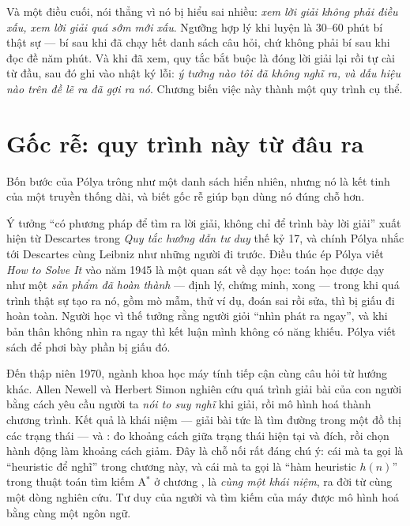 \documentclass[../../algorithm.tex]{subfiles}
\begin{document}
Và một điều cuối, nói thẳng vì nó bị hiểu sai nhiều: \emph{xem lời giải không phải điều xấu, xem lời giải quá sớm mới xấu}. Ngưỡng hợp lý khi luyện là 30--60 phút bí thật sự --- bí sau khi đã chạy hết danh sách câu hỏi, chứ không phải bí sau khi đọc đề năm phút. Và khi đã xem, quy tắc bắt buộc là đóng lời giải lại rồi tự cài từ đầu, sau đó ghi vào nhật ký lỗi: \emph{ý tưởng nào tôi đã không nghĩ ra, và dấu hiệu nào trên đề lẽ ra đã gợi ra nó}. Chương  biến việc này thành một quy trình cụ thể.

\section{Gốc rễ: quy trình này từ đâu ra}

Bốn bước của Pólya trông như một danh sách hiển nhiên, nhưng nó là kết tinh của một truyền thống dài, và biết gốc rễ giúp bạn dùng nó đúng chỗ hơn.

Ý tưởng ``có phương pháp để tìm ra lời giải, không chỉ để trình bày lời giải'' xuất hiện từ Descartes trong \emph{Quy tắc hướng dẫn tư duy} thế kỷ 17, và chính Pólya nhắc tới Descartes cùng Leibniz như những người đi trước. Điều thúc ép Pólya viết \emph{How to Solve It} vào năm 1945 là một quan sát về dạy học: toán học được dạy như một \emph{sản phẩm đã hoàn thành} --- định lý, chứng minh, xong --- trong khi quá trình thật sự tạo ra nó, gồm mò mẫm, thử ví dụ, đoán sai rồi sửa, thì bị giấu đi hoàn toàn. Người học vì thế tưởng rằng người giỏi ``nhìn phát ra ngay'', và khi bản thân không nhìn ra ngay thì kết luận mình không có năng khiếu. Pólya viết sách để phơi bày phần bị giấu đó\cite{polya1945}.

Đến thập niên 1970, ngành khoa học máy tính tiếp cận cùng câu hỏi từ hướng khác. Allen Newell và Herbert Simon nghiên cứu quá trình giải bài của con người bằng cách yêu cầu người ta \emph{nói to suy nghĩ} khi giải, rồi mô hình hoá thành chương trình. Kết quả là khái niệm  --- giải bài tức là tìm đường trong một đồ thị các trạng thái --- và : đo khoảng cách giữa trạng thái hiện tại và đích, rồi chọn hành động làm khoảng cách giảm. Đây là chỗ nối rất đáng chú ý: cái mà ta gọi là ``heuristic để nghĩ'' trong chương này, và cái mà ta gọi là ``hàm heuristic \(h(n)\)'' trong thuật toán tìm kiếm A\(^\ast\) ở chương , là \emph{cùng một khái niệm}, ra đời từ cùng một dòng nghiên cứu. Tư duy của người và tìm kiếm của máy được mô hình hoá bằng cùng một ngôn ngữ.
\end{document}
